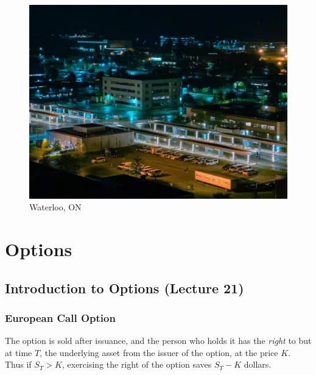 \documentclass[oneside]{book}
\begin{document}
\begin{figure}[H]
    \center
    \includegraphics[scale=0.1]{img/loo.jpg}
    \caption{Waterloo, ON}
\end{figure}


\chapter{Options}
\section{Introduction to Options (Lecture 21)}

\subsection{European Call Option}
The option is sold after issuance, and the person who holds it has the
\textit{right} to but at time $T$,  the underlying asset from the issuer of the
option, at the price $K$. Thus if $S_T > K$, exercising the right of the option
saves $S_T - K$ dollars.
\end{document}
